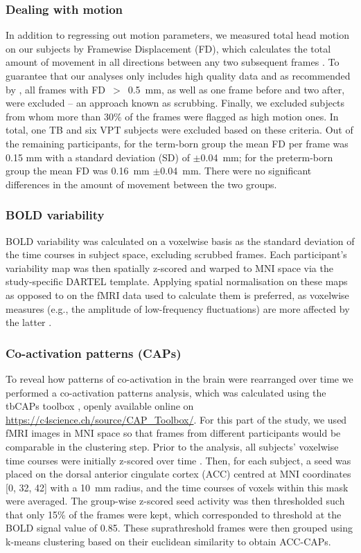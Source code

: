 \subsubsection{Dealing with motion}\label{sec:motion}
In addition to regressing out motion parameters, we measured total head motion on our subjects by Framewise Displacement (FD), which calculates the total amount of movement in all directions between any two subsequent frames  \citep{Power2014a}. To guarantee that our analyses only includes high quality data and as recommended by \citeauthor{Power2014a}, all frames with FD~$>$~0.5~mm, as well as one frame before and two after, were excluded – an approach known as scrubbing. Finally, we excluded subjects from whom more than 30\% of the frames were flagged as high motion ones. In total, one TB and six VPT subjects were excluded based on these criteria. Out of the remaining participants, for the term-born group the mean FD per frame was 0.15 mm with a standard deviation (SD) of $\pm$0.04~mm; for the preterm-born group the mean FD was 0.16~mm $\pm$0.04~mm. There were no significant differences in the amount of movement between the two groups. 

\subsubsection{BOLD variability}\label{met:BOLDvar}

BOLD variability was calculated on a voxelwise basis as the standard deviation of the time courses in subject space, excluding scrubbed frames. Each participant's variability map was then spatially z-scored and warped to MNI space via the study-specific DARTEL template. Applying spatial normalisation on these maps as opposed to on the fMRI data used to calculate them is preferred, as voxelwise measures (e.g., the amplitude of low-frequency fluctuations) are more affected by the latter \citep{Wu2011}. 


\subsubsection{Co-activation patterns (CAPs)}
To reveal how patterns of co-activation in the brain were rearranged over time we performed a co-activation patterns analysis, which was calculated using the tbCAPs toolbox \citep{Bolton2020}, openly available online on \href{https://c4science.ch/source/CAP\_Toolbox/}{https://c4science.ch/source/CAP\_Toolbox/}. For this part of the study, we used fMRI images in MNI space so that frames from different participants would be comparable in the clustering step. Prior to the analysis, all subjects' voxelwise time courses were initially z-scored over time \citep{Liu2013}. Then, for each subject, a seed was placed on the dorsal anterior cingulate cortex (ACC) centred at MNI coordinates [0, 32, 42] \citep{Kolling2016} with a 10~mm radius, and the time courses of voxels within this mask were averaged. The group-wise z-scored seed activity was then thresholded such that only 15\% of the frames \citep{Liu2013} were kept, which corresponded to threshold at the BOLD signal value of 0.85. These suprathreshold frames were then grouped using k-means clustering based on their euclidean similarity to obtain ACC-CAPs. 

